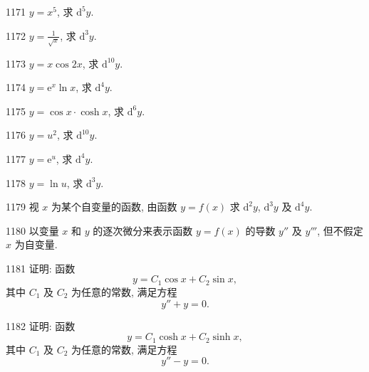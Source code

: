 \begin{prob}[S]{1171}
$y = x^5$, 求 $\mathrm{d}^5 y$.
\end{prob}

\begin{prob}[S]{1172}
$y = \frac{1}{\sqrt{x}}$, 求 $\mathrm{d}^3 y$.
\end{prob}

\begin{prob}[S]{1173}
$y = x\cos 2x$, 求 $\mathrm{d}^{10} y$.
\end{prob}

\begin{prob}[S]{1174}
$y = \mathrm{e}^x\ln x$, 求 $\mathrm{d}^4 y$.
\end{prob}

\begin{prob}[S]{1175}
$y = \cos x\cdot\cosh x$, 求 $\mathrm{d}^6 y$.
\end{prob}


\begin{prob}[S]{1176}
$y = u^2$, 求 $\mathrm{d}^{10} y$.
\end{prob}

\begin{prob}[S]{1177}
$y = \mathrm{e}^u$, 求 $\mathrm{d}^4 y$.
\end{prob}

\begin{prob}[S]{1178}
$y = \ln u$, 求 $\mathrm{d}^3 y$.
\end{prob}

\begin{prob}[M]{1179}
视 $x$ 为某个自变量的函数, 由函数 $y = f(x)$ 求 $\mathrm{d}^2 y$, $\mathrm{d}^3 y$ 及 $\mathrm{d}^4 y$.
\end{prob}

\begin{prob}[M]{1180}
以变量 $x$ 和 $y$ 的逐次微分来表示函数 $y = f(x)$ 的导数 $y''$ 及 $y'''$, 但不假定 $x$ 为自变量.
\end{prob}

\begin{prob}[M]{1181}
证明: 函数
\[
y = C_1\cos x + C_2\sin x,
\]
其中 $C_1$ 及 $C_2$ 为任意的常数, 满足方程
\[
y'' + y = 0.
\]
\end{prob}

\begin{prob}[M]{1182}
证明: 函数
\[
y = C_1\cosh x + C_2\sinh x,
\]
其中 $C_1$ 及 $C_2$ 为任意的常数, 满足方程
\[
y'' - y = 0.
\]
\end{prob}

